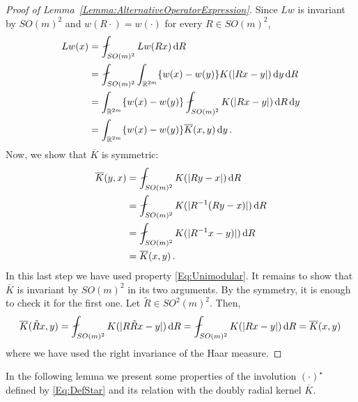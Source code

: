 \begin{proof}[Proof of Lemma~\ref{Lemma:AlternativeOperatorExpression}]
Since $Lw$ is invariant by $SO(m)^2$ and $w(R \cdot) = w(\cdot)$ for every $R\in SO(m)^2$,
\begin{align*}
Lw(x) &= \average_{SO(m)^2} Lw(Rx)\d R\\
&=  \average_{SO(m)^2} \int_{\R^{2m}} \{w(x) - w(y)\}K(|Rx - y|) \d y \d R\\
&= \int_{\R^{2m}} \{w(x) - w(y)\}  \average_{SO(m)^2} K(|Rx - y|) \d R  \d y\\
&= \int_{\R^{2m}} \{w(x) - w(y)\}  \overline{K}(x,y) \d y\,.
\end{align*}
Now, we show that $\overline{K}$ is symmetric:
\begin{align*}
\overline{K}(y,x) &= \average_{SO(m)^2} K(|R y - x|)\d R \\
&= \average_{SO(m)^2} K(|R^{-1} (R y - x)|)\d R \\
&= \average_{SO(m)^2} K(|R^{-1}x-y)|)\d R \\
&= \overline{K}(x,y)\,.
\end{align*}
In this last step we have used property \eqref{Eq:Unimodular}. It remains to show that
$\overline{K}$ is invariant by $SO(m)^2$ in its two arguments. By the symmetry, it is enough to
check it for the first one. Let $\tilde{R} \in SO^2(m)^2$. Then,
$$
\overline{K} (\tilde{R}x, y) = \average_{SO(m)^2} K(|R \tilde{R} x - y|)\d R  = \average_{SO(m)^2} K(|R x - y|)\d R = \overline{K} (x, y)\,
$$
where we have used the right invariance of the Haar measure.
\end{proof}

In the following lemma we present some properties of the involution $(\cdot)^\star$ defined by \eqref{Eq:DefStar} and its relation with the doubly radial kernel $\overline{K}$.

